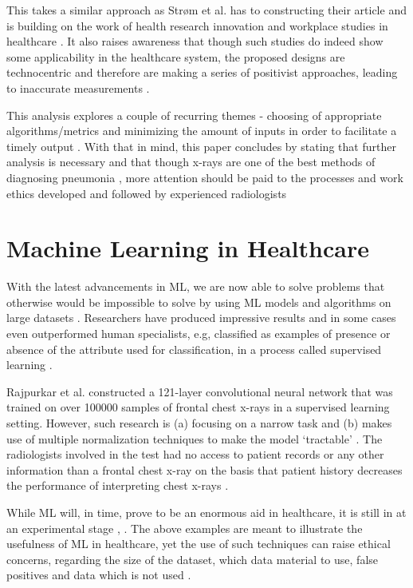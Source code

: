 \documentclass[fullpage]{article}
\begin{document}
\begin{multicols}{2}
This takes a similar approach as Strøm et al. has to constructing their article and is building on the work of health research innovation and workplace studies in healthcare \cite{Engestro}. It also raises awareness that though such studies do indeed show some applicability in the healthcare system, the proposed designs are technocentric and therefore are making a series of positivist approaches, leading to inaccurate measurements \cite{Strom2018}.

This analysis explores a couple of recurring themes - choosing of appropriate algorithms/metrics and minimizing the amount of inputs in order to facilitate a timely output \cite{Rajpurkar}. With that in mind, this paper concludes by stating that further analysis is necessary and that though x-rays are one of the best methods of diagnosing pneumonia \cite{WHO.2001}, more attention should be paid to the processes and work ethics developed and followed by experienced radiologists \cite{Strom2018} 
\section{Machine Learning in Healthcare}
With the latest advancements in ML, we are now able to solve problems that otherwise would be impossible to solve by using ML models and algorithms on large datasets \cite{Ng2016}. Researchers have produced impressive results \cite{Wang} and in some cases even outperformed human specialists, e.g, classified as examples of presence or absence of the attribute used for classification, in a process called supervised learning \cite{Rajpurkar}.

Rajpurkar et al. \cite{Rajpurkar} constructed a 121-layer convolutional neural network that was trained on over 100000 samples of frontal chest x-rays in a supervised learning setting. However, such research is (a) focusing on a narrow task \cite{Strom2018} and (b) makes use of multiple normalization techniques to make the model ‘tractable’ \cite{Rajpurkar}. The radiologists involved in the test had no access to patient records or any other information than a frontal chest x-ray on the basis that patient history decreases the performance of interpreting chest x-rays \cite{Rajpurkar}.

While ML will, in time, prove to be an enormous aid in healthcare, it is still in at an experimental stage \cite{Rajpurkar}, \cite{Wang}. The above examples are meant to illustrate the usefulness of ML in healthcare, yet the use of such techniques can raise ethical concerns, regarding the size of the dataset, which data material to use, false positives and data which is not used \cite{RWBOMLH}.	


\end{multicols}
\end{document}
